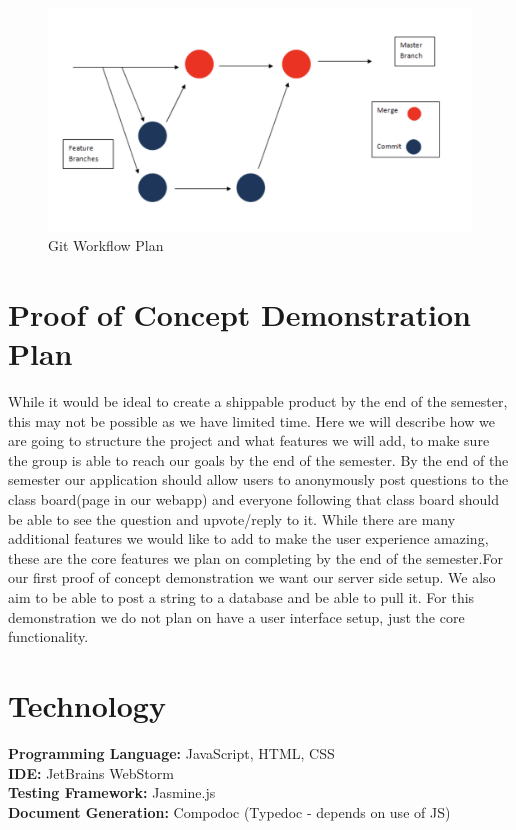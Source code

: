 \documentclass{article}
\begin{document}
\begin{figure}[h!]
  \centering 
  \includegraphics[scale=.69]{img/plan.png}
  \caption{Git Workflow Plan}
  \label{plan}
\end{figure}

\section{Proof of Concept Demonstration Plan}
While it would be ideal to create a shippable product by the end of the semester, this may not be possible as we have limited time. Here we will describe how we are going to structure the project and what features we will add, to make sure the group is able to reach our goals by the end of the semester. By the end of the semester our application should allow users to anonymously post questions to the class board(page in our webapp) and everyone following that class board should be able to see the question and upvote/reply to it. While there are many additional features we would like to add to make the user experience amazing, these are the core features we plan on completing by the end of the semester.For our first proof of concept demonstration we want our server side setup. We also aim to be able to post a string to a database and be able to pull it. For this demonstration we do not plan on have a user interface setup, just the core functionality.

\section{Technology}

\textbf{Programming Language:} JavaScript, HTML, CSS \\ 
\textbf{IDE:} JetBrains WebStorm\\
\textbf{Testing Framework:} Jasmine.js \\
\textbf{Document Generation:} Compodoc (Typedoc - depends on use of JS) \\ 
\end{document}
